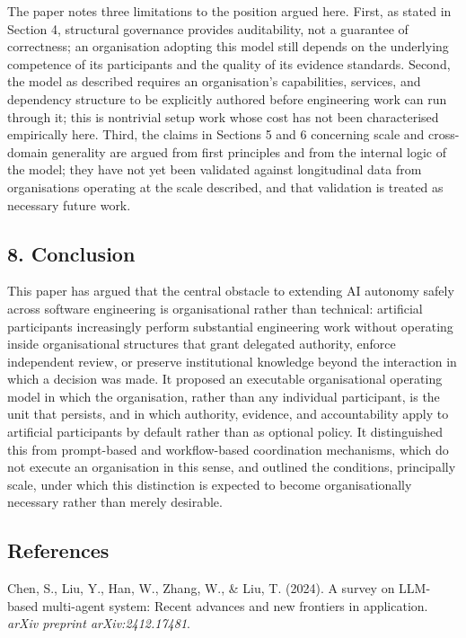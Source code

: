 \documentclass[
  11pt,
]{article}
\begin{document}
The paper notes three limitations to the position argued here. First, as
stated in Section 4, structural governance provides auditability, not a
guarantee of correctness; an organisation adopting this model still
depends on the underlying competence of its participants and the quality
of its evidence standards. Second, the model as described requires an
organisation's capabilities, services, and dependency structure to be
explicitly authored before engineering work can run through it; this is
nontrivial setup work whose cost has not been characterised empirically
here. Third, the claims in Sections 5 and 6 concerning scale and
cross-domain generality are argued from first principles and from the
internal logic of the model; they have not yet been validated against
longitudinal data from organisations operating at the scale described,
and that validation is treated as necessary future work.

\hypertarget{conclusion}{%
\subsection{8. Conclusion}\label{conclusion}}

This paper has argued that the central obstacle to extending AI autonomy
safely across software engineering is organisational rather than
technical: artificial participants increasingly perform substantial
engineering work without operating inside organisational structures that
grant delegated authority, enforce independent review, or preserve
institutional knowledge beyond the interaction in which a decision was
made. It proposed an executable organisational operating model in which
the organisation, rather than any individual participant, is the unit
that persists, and in which authority, evidence, and accountability
apply to artificial participants by default rather than as optional
policy. It distinguished this from prompt-based and workflow-based
coordination mechanisms, which do not execute an organisation in this
sense, and outlined the conditions, principally scale, under which this
distinction is expected to become organisationally necessary rather than
merely desirable.

\hypertarget{references}{%
\subsection{References}\label{references}}

Chen, S., Liu, Y., Han, W., Zhang, W., \& Liu, T. (2024). A survey on
LLM-based multi-agent system: Recent advances and new frontiers in
application. \emph{arXiv preprint arXiv:2412.17481}.
\end{document}
